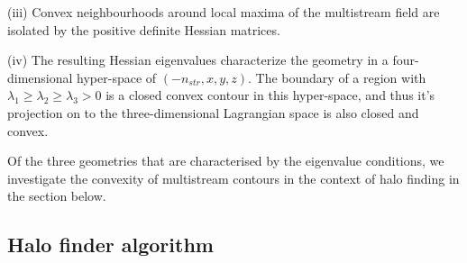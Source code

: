 \documentclass[fleqn,usenatbib,useAMS]{mnras}
\begin{document}
(iii) Convex neighbourhoods around local maxima of the multistream field are isolated by the positive definite Hessian matrices. 

(iv) The resulting Hessian eigenvalues characterize the geometry in a four-dimensional
hyper-space of $(-n_{str}, x, y, z)$. The boundary of a region with $\lambda_1 \geq \lambda_2 \geq \lambda_3 > 0$ is a closed convex contour in this hyper-space, and thus it’s projection on to the three-dimensional Lagrangian space is also closed and convex.

Of the three geometries that are characterised by the eigenvalue conditions, we investigate the convexity of multistream contours in the context of halo finding in the section below.


\subsection{Halo finder algorithm}
\label{subsec:technique}
\end{document}
